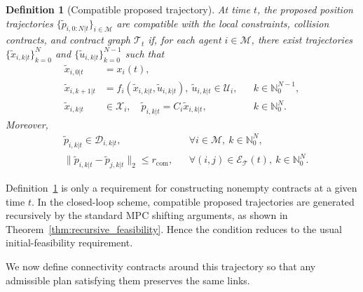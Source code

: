 \documentclass[letterpaper, 10 pt, conference]{ieeeconf}  %
\newtheorem{definition}{Definition}
\begin{document}
\begin{definition}[Compatible proposed trajectory]
	\label{def:compatible_proposed_trajectory}
	At time $t$, the proposed position trajectories
	$\{\tilde p_{i,0:N|t}\}_{i\in\mathcal{M}}$ are compatible with the local
	constraints, collision contracts, and contract graph $\mathcal{T}_t$ if, for
	each agent $i\in\mathcal{M}$, there exist trajectories
	$\{\tilde x_{i,k|t}\}_{k=0}^{N}$ and
	$\{\tilde u_{i,k|t}\}_{k=0}^{N-1}$ such that
	\begin{align}
		\tilde x_{i,0|t}
		 & =
		x_i(t),
		\label{eq:proposed_initial_condition}
		\\
		\tilde x_{i,k+1|t}
		 & =
		f_i(\tilde x_{i,k|t},\tilde u_{i,k|t}),\
		\tilde u_{i,k|t}\in\mathcal{U}_i,
		 &     & k\in\mathbb{N}_0^{N-1},
		\label{eq:proposed_dynamics_inputs}
		\\
		\tilde x_{i,k|t}
		 & \in
		\mathcal{X}_i,\quad
		\tilde p_{i,k|t}
		=
		C_i\tilde x_{i,k|t},
		 &     & k\in\mathbb{N}_0^{N}.
		\label{eq:proposed_state_constraint_position}
	\end{align}
	Moreover,
	\begin{align}
		 & \tilde p_{i,k|t}
		\in
		\mathcal{D}_{i,k|t},
		 &                                         & \forall i\in\mathcal{M},\ k\in\mathbb{N}_0^N,
		\label{eq:proposed_inside_collision_contracts}
		\\
		 & \|\tilde p_{i,k|t}-\tilde p_{j,k|t}\|_2
		\leq
		r_{\mathrm{com}},
		 &                                         & \forall (i,j)\in\mathcal{E}_{\mathcal{T}}(t),\
		k\in\mathbb{N}_0^N.
		\label{eq:proposed_trajectory_compatible_tree}
	\end{align}
\end{definition}

Definition~\ref{def:compatible_proposed_trajectory} is only a requirement for
constructing nonempty contracts at a given time $t$. In the closed-loop scheme,
compatible proposed trajectories are generated recursively by the standard MPC
shifting arguments, as shown in Theorem~\ref{thm:recursive_feasibility}. Hence the condition
reduces to the usual initial-feasibility requirement.

We now define
connectivity contracts around this trajectory so that any admissible plan
satisfying them preserves the same links.
\end{document}
